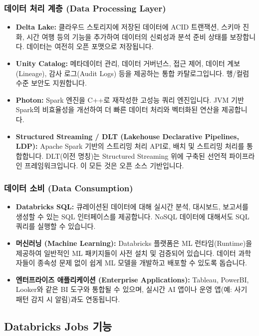 \documentclass[11pt,a4paper]{article}
\theoremstyle{definition}
\begin{document}
\subsubsection{데이터 처리 계층 (Data Processing Layer)}
\begin{itemize}
    \item \textbf{Delta Lake:} 클라우드 스토리지에 저장된 데이터에 ACID 트랜잭션, 스키마 진화, 시간 여행 등의 기능을 추가하여 데이터의 신뢰성과 분석 준비 상태를 보장합니다. 데이터는 여전히 오픈 포맷으로 저장됩니다.
    \item \textbf{Unity Catalog:} 메타데이터 관리, 데이터 거버넌스, 접근 제어, 데이터 계보(Lineage), 감사 로그(Audit Logs) 등을 제공하는 통합 카탈로그입니다. 행/컬럼 수준 보안도 지원합니다.
    \item \textbf{Photon:} Spark 엔진을 C++로 재작성한 고성능 쿼리 엔진입니다. JVM 기반 Spark의 비효율성을 개선하여 더 빠른 데이터 처리와 벡터화된 연산을 제공합니다.
    \item \textbf{Structured Streaming / DLT (Lakehouse Declarative Pipelines, LDP):} Apache Spark 기반의 스트리밍 처리 API로, 배치 및 스트리밍 처리를 통합합니다. DLT(이전 명칭)는 Structured Streaming 위에 구축된 선언적 파이프라인 프레임워크입니다. 이 모든 것은 오픈 소스 기반입니다.
\end{itemize}

\subsubsection{데이터 소비 (Data Consumption)}
\begin{itemize}
    \item \textbf{Databricks SQL:} 큐레이션된 데이터에 대해 실시간 분석, 대시보드, 보고서를 생성할 수 있는 SQL 인터페이스를 제공합니다. NoSQL 데이터에 대해서도 SQL 쿼리를 실행할 수 있습니다.
    \item \textbf{머신러닝 (Machine Learning):} Databricks 플랫폼은 ML 런타임(Runtime)을 제공하여 일반적인 ML 패키지들이 사전 설치 및 검증되어 있습니다. 데이터 과학자들이 종속성 문제 없이 쉽게 ML 모델을 개발하고 배포할 수 있도록 돕습니다.
    \item \textbf{엔터프라이즈 애플리케이션 (Enterprise Applications):} Tableau, PowerBI, Looker와 같은 BI 도구와 통합될 수 있으며, 실시간 AI 앱이나 운영 앱(예: 사기 패턴 감지 시 알림)과도 연동됩니다.
\end{itemize}

\subsection{Databricks Jobs 기능}
\end{document}
